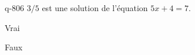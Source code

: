 \begin{truefalse}{q-806}
$3/5$ est une solution de l'équation $5x+4=7$.
\item* Vrai
\item Faux
\end{truefalse}

